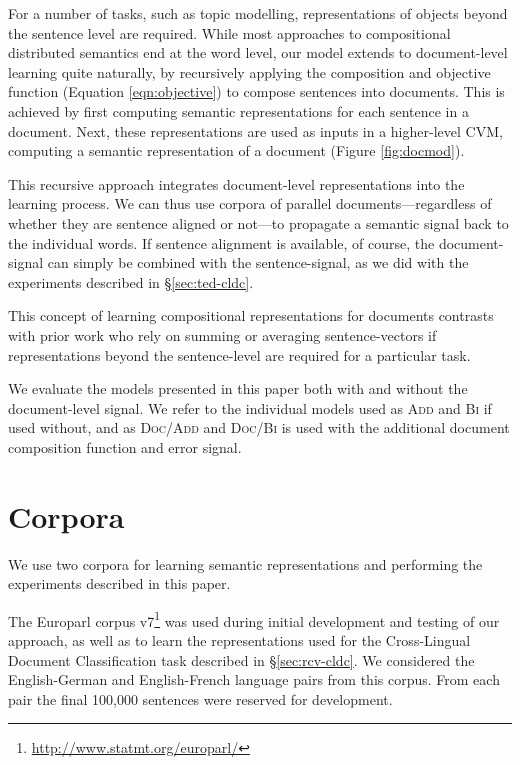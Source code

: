 \documentclass[11pt]{article}
\newcommand{\addMod}{\textsc{Add}\xspace}
\newcommand{\flatMod}{\textsc{Bi}\xspace}
\newcommand{\docModadd}{\textsc{Doc/Add}\xspace}
\newcommand{\docModflat}{\textsc{Doc/Bi}\xspace}
\newcommand{\CVM}{\textsc{CVM}\xspace}
\begin{document}
For a number of tasks, such as topic modelling, representations of objects beyond
the sentence level are required. While most approaches to compositional
distributed semantics end at the word level, our model extends to document-level
learning quite naturally, by recursively applying the composition and objective
function (Equation \ref{eqn:objective}) to compose sentences into documents.
This is achieved by first computing semantic representations for each sentence
in a document.  Next, these representations are used as inputs in a higher-level
\CVM, computing a semantic representation of a document (Figure
  \ref{fig:docmod}).

This recursive approach integrates document-level representations into the
learning process. We can thus use corpora of parallel documents---regardless of
whether they are sentence aligned or not---to propagate a semantic signal back
to the individual words.
If sentence alignment is available, of course, the document-signal can simply be
combined with the sentence-signal, as we did with the experiments described in
\S\ref{sec:ted-cldc}.

This concept of learning compositional representations for documents contrasts
with prior work \cite[\textit{inter alia}]{Socher:2011,Klementiev:2012} who rely
on summing or averaging sentence-vectors if representations beyond the
sentence-level are required for a particular task.

We evaluate the models presented in this paper both with and without the
document-level signal. We refer to the individual models used as \addMod and
\flatMod if used without, and as \docModadd and \docModflat is used with the
additional document composition function and error signal.
 \section{Corpora}\label{sec:corpus}

We use two corpora for learning semantic representations and performing the
experiments described in this paper.

The Europarl corpus v7\footnote{\url{http://www.statmt.org/europarl/}}
\cite{Koehn:2005} was used during initial development and testing of our
approach, as well as to learn the representations used for the Cross-Lingual
Document Classification task described in \S\ref{sec:rcv-cldc}.  We considered
the English-German and English-French language pairs from this corpus.  From
each pair the final 100,000 sentences were reserved for development.
\end{document}
